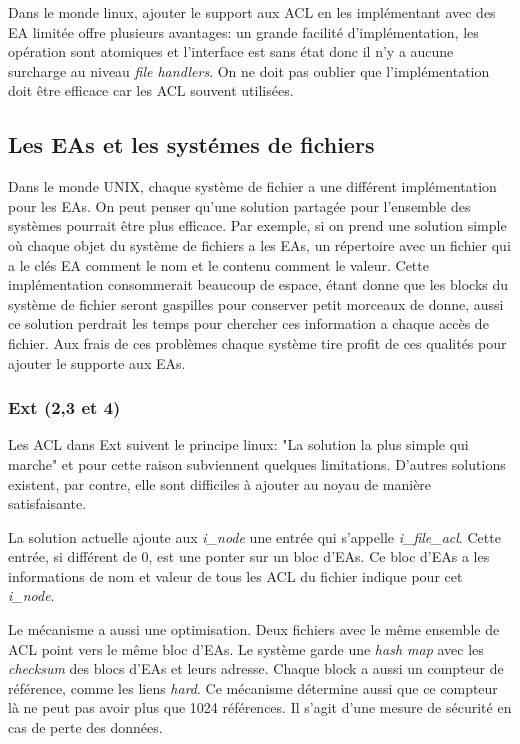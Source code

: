 Dans le monde linux, ajouter le support aux ACL en les implémentant avec des EA limitée offre plusieurs avantages: un grande facilité d'implémentation, les opération sont atomiques et l'interface est sans état donc il n'y a aucune surcharge au niveau \emph{file handlers}. On ne doit pas oublier que l'implémentation doit être efficace car les ACL souvent utilisées.
 
\subsection{Les EAs et les systémes de fichiers}
 
Dans le monde UNIX, chaque système de fichier a une différent implémentation pour les EAs. On peut penser qu'une solution partagée pour l'ensemble des systèmes pourrait être plus efficace. Par exemple, si on prend une solution simple où chaque objet du système de fichiers a les EAs, un répertoire avec un fichier qui a le clés EA comment le nom et le contenu comment le valeur. Cette implémentation consommerait beaucoup de espace, étant donne que les blocks du système de fichier seront gaspilles pour conserver petit morceaux de donne, aussi ce solution perdrait les temps pour chercher ces information a chaque accès de fichier. Aux frais de ces problèmes chaque système tire profit de ces qualités pour ajouter le supporte aux EAs.
 
\subsubsection*{Ext (2,3 et 4)}
 
Les ACL dans Ext suivent le principe linux: "La solution la plus simple qui marche" et pour cette raison subviennent quelques limitations. D'autres solutions existent, par contre, elle sont difficiles à ajouter au noyau de manière satisfaisante\cite{ext_acl}.
 
La solution actuelle ajoute aux \emph{i\_node} une entrée qui s'appelle \emph{i\_file\_acl}. Cette entrée, si différent de 0, est une ponter sur un bloc d'EAs. Ce bloc d'EAs a les informations de nom et valeur de tous les ACL du fichier indique pour cet \emph{i\_node}.
 
Le mécanisme a aussi une optimisation. Deux fichiers avec le même ensemble de ACL point vers le même bloc d'EAs. Le système garde une \emph{hash map} avec les \emph{checksum} des blocs d'EAs et leurs adresse. Chaque block a aussi un compteur de référence, comme les liens \emph{hard}. Ce mécanisme détermine aussi que ce compteur là ne peut pas avoir plus que 1024 références. Il s'agit d'une mesure de sécurité en cas de perte des données.
 

